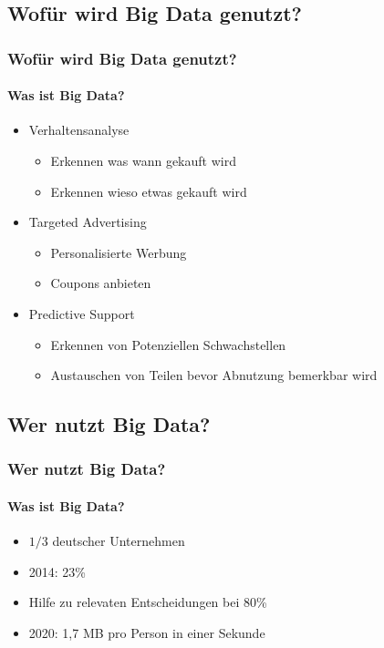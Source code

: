 \documentclass[10pt,a4paper]{beamer}
\begin{document}
\subsection{Wofür wird Big Data genutzt?}
\begin{frame}
\frametitle{Wofür wird Big Data genutzt?}
\framesubtitle{Was ist Big Data?}
\begin{itemize}
\item Verhaltensanalyse
	\begin{itemize}
	\item Erkennen was wann gekauft wird
	\item Erkennen wieso etwas gekauft wird
	\end{itemize} \pause
\item Targeted Advertising
	\begin{itemize}
	\item Personalisierte Werbung
	\item Coupons anbieten 
	\end{itemize} \pause
\item Predictive Support
	\begin{itemize}
	\item Erkennen von Potenziellen Schwachstellen
	\item Austauschen von Teilen bevor Abnutzung bemerkbar wird
	\end{itemize}
\end{itemize}
\end{frame}

\subsection{Wer nutzt Big Data?}
\begin{frame}
\frametitle{Wer nutzt Big Data?}
\framesubtitle{Was ist Big Data?}
\begin{itemize}
\item \( 1/3\) deutscher Unternehmen
\pause
\item 2014: 23\%
\pause
\item Hilfe zu relevaten Entscheidungen bei 80\%
\pause
\item 2020: 1,7 MB pro Person in einer Sekunde 
\end{itemize}
\end{frame}
\end{document}
